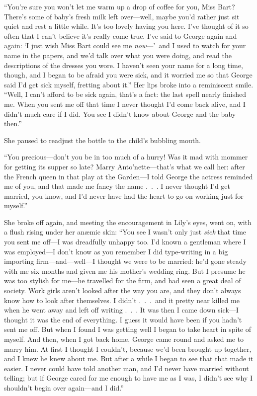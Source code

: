 \documentclass[12pt,a4paper]{book}
\begin{document}
``You're sure you won't let me warm up a drop of coffee for you,
Miss Bart? There's some of baby's fresh milk left over---well,
maybe you'd rather just sit quiet and rest a little while. It's
too lovely having you here. I've thought of it so often that I
can't believe it's really come true. I've said to George again
and again: `I just wish Miss Bart could see me \textit{now}---'\ and I used
to watch for your name in the papers, and we'd talk over what you
were doing, and read the descriptions of the dresses you wore. I
haven't seen your name for a long time, though, and I began to be
afraid you were sick, and it worried me so that George said I'd
get sick myself, fretting about it.'' Her lips broke into a
reminiscent smile. ``Well, I can't afford to be sick again, that's
a fact: the last spell nearly finished me. When you sent me off
that time I never thought I'd come back alive, and I didn't much
care if I did. You see I didn't know about George and the baby
then.''





She paused to readjust the bottle to the child's bubbling mouth.





``You precious---don't you be in too much of a hurry! Was it mad
with mommer for getting its supper so late? Marry
Anto'nette---that's what we call her: after the French queen in
that play at the Garden---I told George the actress reminded me of
you, and that made me fancy the name .\ .\ . I never thought I'd
get married, you know, and I'd never have had the heart to go on
working just for myself.''





She broke off again, and meeting the encouragement in Lily's
eyes, went on, with a flush rising under her an{\ae}mic skin: ``You
see I wasn't only just \textit{sick} that time you sent me off---I was
dreadfully unhappy too. I'd known a gentleman where I was
employed---I don't know as you remember I did type-writing in a
big importing firm---and---well---I thought we were to be married: 
he'd gone steady with me six months and given me his mother's
wedding ring. But I presume he was too stylish for me---he
travelled for the firm, and had seen a great deal of society. 
Work girls aren't looked after the way you are, and they don't
always know how to look after themselves. I didn't .\ .\ .\ and it
pretty near killed me when he went away and left off writing .\ .\ . 
It was then I came down sick---I thought it was the end of
everything. I guess it would have been if you hadn't sent me off. 
But when I found I was getting well I began to take heart in
spite of myself. And then, when I got back home, George came
round and asked me to marry him. At first I thought I couldn't,
because we'd been brought up together, and I knew he knew about
me. But after a while I began to see that that made it easier. I
never could have told another man, and I'd never have married
without telling; but if George cared for me enough to have me as
I was, I didn't see why I shouldn't begin over again---and I did.''
\end{document}
